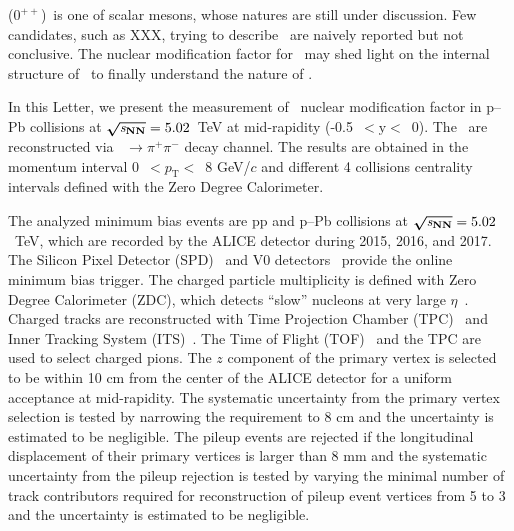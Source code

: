 \documentclass[ALICE,manyauthors]{cernphprep}
\begin{document}
\fzero($0^{++}$)~is one of scalar mesons, whose natures are still under discussion. Few candidates, such as XXX, trying to describe \fzero~are naively reported but not conclusive. The nuclear modification factor for \fzero~may shed light on the internal structure of \fzero~to finally understand the nature of \fzero.

In this Letter, we present the measurement of \fzero~nuclear modification factor in p--Pb collisions at $\boldsymbol{\sqrt{{\textit s_{\mathrm{NN}}}}}=5.02$~TeV at mid-rapidity (-0.5~$<\mathrm{y}<$~0). The \fzero~are reconstructed via \fzero~$\rightarrow \pi^{+}\pi^{-}$ decay channel. The results are obtained in the momentum interval 0~$<p_{\mathrm{T}}<$~8 GeV/$c$ and different 4 collisions centrality intervals defined with the Zero Degree Calorimeter. 

The analyzed minimum bias events are pp and p--Pb collisions at $\boldsymbol{\sqrt{{\textit s_{\mathrm{NN}}}}}=5.02$~TeV, which are recorded by the ALICE detector during 2015, 2016, and 2017. The Silicon Pixel Detector (SPD)~\cite{Cali:2008zz} and V0 detectors~\cite{ALICE:2013axi} provide the online minimum bias trigger. The charged particle multiplicity is defined with Zero Degree Calorimeter (ZDC), which detects ``slow'' nucleons at very large $\eta$~\cite{Cortese:2019nnv}. Charged tracks are reconstructed with Time Projection Chamber (TPC)~\cite{Alme:2010ke} and Inner Tracking System (ITS)~\cite{ALICE:2010tia}. The Time of Flight (TOF)~\cite{Jacazio:2018slq} and the TPC are used to select charged pions. The $z$ component of the primary vertex is selected to be within 10 cm from the center of the ALICE detector for a uniform acceptance at mid-rapidity. The systematic uncertainty from the primary vertex selection is tested by narrowing the requirement to 8 cm and the uncertainty is estimated to be negligible. The pileup events are rejected if the longitudinal displacement of their primary vertices is larger than 8 mm and the systematic uncertainty from the pileup rejection is tested by varying the minimal number of track contributors required for reconstruction of pileup event vertices from 5 to 3 and the uncertainty is estimated to be negligible.
\end{document}
